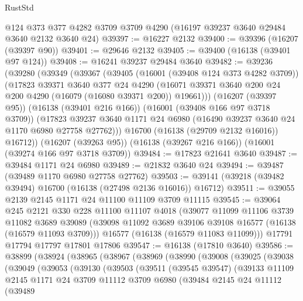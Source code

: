 \begin{lexlean}{RustStd}
\begin{coremodule}
    @124
    @373
    @377
    @4282
    @3709
    @3709
    @4290
    (@16197 @39237 @3640 @29484 @3640 @2132 @3640 @24)
@39397 := @16227 @2132
@39400 := @39396 (@16207 (@39397 @90))
@39401 := @29646 @2132
@39405 := @39400 (@16138 (@39401 @97 @124))
@39408 := @16241 @39237 @29484 @3640
@39482 := @39236
    (@39280
      (@39349
        (@39367
          (@39405
            (@16001 (@39408 @124 @373 @4282 @3709))
            (@17823
              @39371
              @3640
              @377
              @24
              @4290
              (@16071 @39371 @3640 @200 @24 @200 @4290 (@16079 (@16080 @39371 @200)) @19661)))
          (@16207 (@39397 @95))
          (@16138 (@39401 @216 @166))
          (@16001 (@39408 @166 @97 @3718 @3709))
          (@17823 @39237 @3640 @1171 @24 @6980 (@16490 @39237 @3640 @24 @1170 @6980 @27758 @27762)))
        @16700
        (@16138 (@29709 @2132 @16016))
        @16712))
    (@16207 (@39263 @95))
    (@16138 (@39267 @216 @166))
    (@16001 (@39274 @166 @97 @3718 @3709))
@39484 := @17823 @21641 @3640
@39487 := @39484 @1171 @24 @6980
@39489 := @21832 @3640 @24
@39494 := @39487 (@39489 @1170 @6980 @27758 @27762)
@39503 := @39141 (@39218 (@39482 @39494) @16700 (@16138 (@27498 @2136 @16016)) @16712)
@39511 := @39055 @2139 @2145 @1171 @24 @11100 @11109 @3709 @11115
@39545 := @39064
    @245
    @2121
    @330
    @228
    @11100
    @11107
    @4018
    (@39077
      @11099
      @11106
      @3739
      @11082
      @3689
      @39089
      (@39098 @11092 @3689 @39106 @39108 @16577 (@16138 (@16579 @11093 @3709)))
      @16577
      (@16138 (@16579 @11083 @11099)))
    @17791
    @17794
    @17797
    @17801
    @17806
@39547 := @16138 (@17810 @3640)
@39586 := @38899
    (@38924
      (@38965
        (@38967
          (@38969
            (@38990
              (@39008
                (@39025
                  (@39038
                    (@39049
                      (@39053
                        (@39130
                          (@39503
                            (@39511
                              (@39545 @39547)
                              (@39133
                                @11109
                                @2145
                                @1171
                                @24
                                @3709
                                @11112
                                @3709
                                @6980
                                (@39484
                                  @2145
                                  @24
                                  @11112
                                  (@39489

\end{coremodule}
\end{lexlean}
